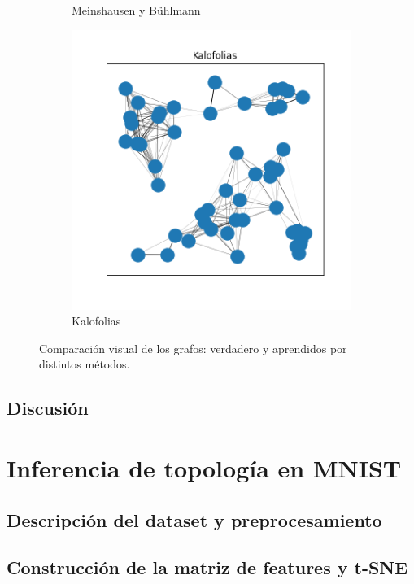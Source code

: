 \documentclass{article}
\begin{document}
\begin{figure}[htb]
\begin{subfigure}[t]{0.24\linewidth}
        \caption{Meinshausen y Bühlmann}
    \end{subfigure}\hfill
    \begin{subfigure}[t]{0.24\linewidth}
        \centering
        \includegraphics[width=\textwidth]{imagenes/generated_graph_syntetic/kalofolias.png}
        \caption{Kalofolias}
    \end{subfigure}
    \caption{Comparación visual de los grafos: verdadero y aprendidos por distintos métodos.}
    \label{fig:generated_graphs_syntetic}
\end{figure}

\subsection{Discusión}


\section{Inferencia de topología en MNIST}

\subsection{Descripción del dataset y preprocesamiento}

\subsection{Construcción de la matriz de features y t-SNE}
\end{document}
